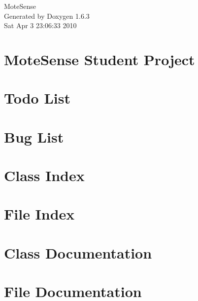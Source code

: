 \documentclass[a4paper]{book}
\begin{document}
\hypersetup{pageanchor=false}
\begin{titlepage}
\vspace*{7cm}
\begin{center}
{\Large MoteSense }\\
\vspace*{1cm}
{\large Generated by Doxygen 1.6.3}\\
\vspace*{0.5cm}
{\small Sat Apr 3 23:06:33 2010}\\
\end{center}
\end{titlepage}
\clearemptydoublepage
{}
\tableofcontents
\clearemptydoublepage
{}
\hypersetup{pageanchor=true}
\chapter{MoteSense Student Project}
\label{index}\hypertarget{index}{}
\chapter{Todo List}
\label{todo}
\hypertarget{todo}{}

\chapter{Bug List}
\label{bug}
\hypertarget{bug}{}

\chapter{Class Index}

\chapter{File Index}

\chapter{Class Documentation}





\chapter{File Documentation}











\printindex
\end{document}
